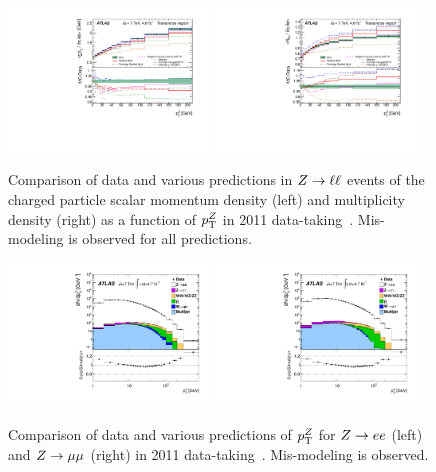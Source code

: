 \begin{figure}[tp]
  \centering
  \includegraphics[width=0.48\textwidth]{figures/STDM-2011-42/fig_14b}
  \includegraphics[width=0.48\textwidth]{figures/STDM-2011-42/fig_17b}
  \caption{Comparison of data and various predictions in $Z \rightarrow \ell\ell$ events of the charged particle scalar momentum density (left) and multiplicity density (right) as a function of $p_{\mathrm{T}}^Z$ in 2011 data-taking~\cite{STDM-2011-42}. Mis-modeling is observed for all predictions.}
  \label{fig:backgrounds-zue}
\end{figure}

\begin{figure}[tp]
  \centering
  \includegraphics[width=0.48\textwidth]{figures/STDM-2012-23/fig_01a}
  \includegraphics[width=0.48\textwidth]{figures/STDM-2012-23/fig_01b}
  \caption{Comparison of data and various predictions of $p_{\mathrm{T}}^Z$ for $Z \rightarrow ee$ (left) and $Z \rightarrow \mu\mu$ (right) in 2011 data-taking~\cite{STDM-2012-23}. Mis-modeling is observed.}
  \label{fig:backgrounds-zpt}
\end{figure}

